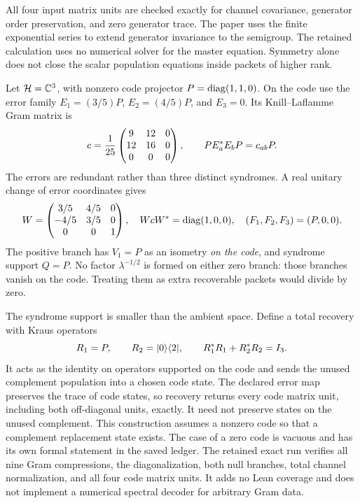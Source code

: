 All four input matrix units are checked exactly for channel covariance, generator order preservation, and zero generator trace. The paper uses the finite exponential series to extend generator invariance to the semigroup. The retained calculation uses no numerical solver for the master equation. Symmetry alone does not close the scalar population equations inside packets of higher rank.

Let $\mathcal H=\mathbb C^3$, with nonzero code projector $P=\operatorname{diag}(1,1,0)$. On the code use the error family $E_1=(3/5)P$, $E_2=(4/5)P$, and $E_3=0$. Its Knill--Laflamme Gram matrix is
\[
c=\frac1{25}\begin{pmatrix}9&12&0\\12&16&0\\0&0&0\end{pmatrix},
\qquad PE_a^*E_bP=c_{ab}P.
\]
The errors are redundant rather than three distinct syndromes. A real unitary change of error coordinates gives
\[
W=\begin{pmatrix}3/5&4/5&0\\-4/5&3/5&0\\0&0&1\end{pmatrix},
\quad WcW^*=\operatorname{diag}(1,0,0),
\quad(F_1,F_2,F_3)=(P,0,0).
\]
The positive branch has $V_1=P$ as an isometry \emph{on the code}, and syndrome support $Q=P$. No factor $\lambda^{-1/2}$ is formed on either zero branch: those branches vanish on the code. Treating them as extra recoverable packets would divide by zero.

The syndrome support is smaller than the ambient space. Define a total recovery with Kraus operators
\[
R_1=P,\qquad R_2=\lvert 0\rangle\langle 2\rvert,
\qquad R_1^*R_1+R_2^*R_2=I_3.
\]
It acts as the identity on operators supported on the code and sends the unused complement population into a chosen code state. The declared error map preserves the trace of code states, so recovery returns every code matrix unit, including both off-diagonal units, exactly. It need not preserve states on the unused complement.
This construction assumes a nonzero code so that a complement replacement state exists. The case of a zero code is vacuous and has its own formal statement in the saved ledger. The retained exact run verifies all nine Gram compressions, the diagonalization, both null branches, total channel normalization, and all four code matrix units. It adds no Lean coverage and does not implement a numerical spectral decoder for arbitrary Gram data.

